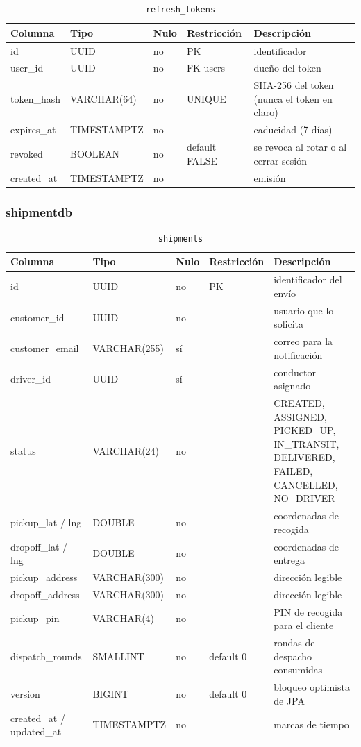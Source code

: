 \documentclass[conference]{IEEEtran}
\newcommand{\pkg}[1]{\texttt{#1}}
\begin{document}
\begin{table}[!t]
\centering
\caption{\pkg{refresh\_tokens}}

\begin{tabular}{@{}L{3.4cm}L{3.2cm}L{1.2cm}L{3.6cm}L{3.4cm}@{}}
\toprule
\textbf{Columna} & \textbf{Tipo} & \textbf{Nulo} & \textbf{Restricción} & \textbf{Descripción}\\
\midrule
id & UUID & no & PK & identificador\\
user\_id & UUID & no & FK users & dueño del token\\
token\_hash & VARCHAR(64) & no & UNIQUE & SHA-256 del token (nunca el token en claro)\\
expires\_at & TIMESTAMPTZ & no & & caducidad (7 días)\\
revoked & BOOLEAN & no & default FALSE & se revoca al rotar o al cerrar sesión\\
created\_at & TIMESTAMPTZ & no & & emisión\\
\bottomrule
\end{tabular}
\end{table}

\subsubsection{shipmentdb}

\begin{table}[!t]
\centering
\caption{\pkg{shipments}}

\begin{tabular}{@{}L{3.2cm}L{3.2cm}L{1.1cm}L{3.4cm}L{3.9cm}@{}}
\toprule
\textbf{Columna} & \textbf{Tipo} & \textbf{Nulo} & \textbf{Restricción} & \textbf{Descripción}\\
\midrule
id & UUID & no & PK & identificador del envío\\
customer\_id & UUID & no & & usuario que lo solicita\\
customer\_email & VARCHAR(255) & sí & & correo para la notificación\\
driver\_id & UUID & sí & & conductor asignado\\
status & VARCHAR(24) & no & & CREATED, ASSIGNED, PICKED\_UP, IN\_TRANSIT, DELIVERED, FAILED,
CANCELLED, NO\_DRIVER\\
pickup\_lat / lng & DOUBLE & no & & coordenadas de recogida\\
dropoff\_lat / lng & DOUBLE & no & & coordenadas de entrega\\
pickup\_address & VARCHAR(300) & no & & dirección legible\\
dropoff\_address & VARCHAR(300) & no & & dirección legible\\
pickup\_pin & VARCHAR(4) & no & & PIN de recogida para el cliente\\
dispatch\_rounds & SMALLINT & no & default 0 & rondas de despacho consumidas\\
version & BIGINT & no & default 0 & bloqueo optimista de JPA\\
created\_at / updated\_at & TIMESTAMPTZ & no & & marcas de tiempo\\
\bottomrule
\end{tabular}
\end{table}
\end{document}
